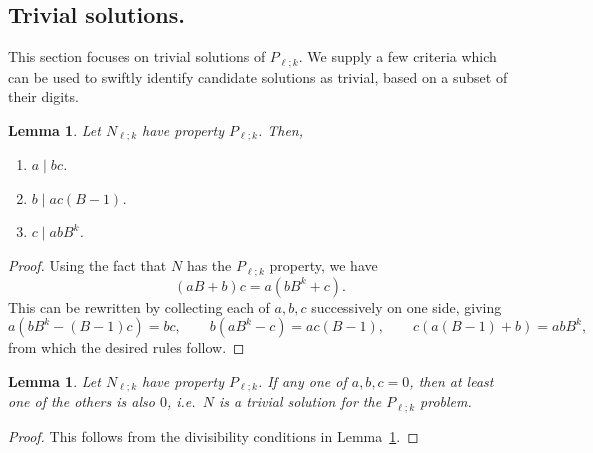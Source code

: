 \documentclass[sn-mathphys]{sn-jnl}%
\theoremstyle{thmstyleone}%
\newtheorem{lemma}[theorem]{Lemma}
\theoremstyle{thmstyletwo}%
\theoremstyle{thmstylethree}%
\begin{document}
\begin{appendices}

\section{Trivial solutions.}

This section focuses on trivial solutions of $P_{\ell; k}$. We supply
a few criteria which can be used to swiftly identify candidate solutions
as trivial, based on a subset of their digits.

\begin{lemma} \label{lemma:divisibility}
    Let $N_{\ell; k}$ have property $P_{\ell; k}$. Then, \begin{enumerate}
        \item $a \mid bc$.
        \item $b \mid ac(B - 1)$.
        \item $c \mid abB^k$.
    \end{enumerate}
\end{lemma}
\begin{proof}
    Using the fact that $N$ has the $P_{\ell; k}$ property, we have \[
        (aB + b)c = a(bB^k + c).
    \] This can be rewritten by collecting each of $a, b, c$ successively on one side,
    giving \[
        a(bB^k - (B - 1)c) = bc, \qquad
        b(aB^k - c) = ac(B - 1), \qquad
        c(a(B - 1) + b) = abB^k,
    \] from which the desired rules follow.
\end{proof}

\begin{lemma} \label{lemma:trivial_1}
    Let $N_{\ell; k}$ have property $P_{\ell; k}$.
    If any one of $a, b, c = 0$, then at least one of the others is also $0$, i.e.\ $N$
    is a trivial solution for the $P_{\ell; k}$ problem.
\end{lemma}
\begin{proof}
    This follows from the divisibility conditions in Lemma~\ref{lemma:divisibility}.
\end{proof}


\end{appendices}
\end{document}
